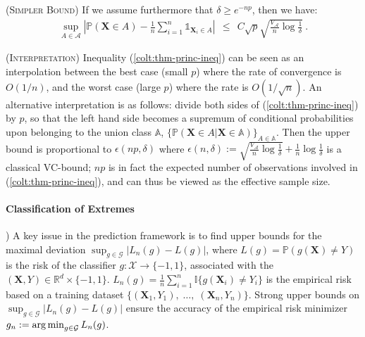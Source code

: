 \begin{remark} (\textsc{Simpler Bound})
If we assume furthermore that $\delta \ge e^{-np}$, then we have:
\begin{align*}
\sup_{A \in \mathcal{A}} \left | \mathbb{P}(\mathbf{X} \in A) - \frac{1}{n} \sum_{i=1}^n \mathds{1}_{\mathbf{X}_i \in A} \right| ~~\le~~ C \sqrt{p} \sqrt{\frac{V_{\mathcal{A}}}{n} \log{\frac{1}{\delta}}}~.
\end{align*}
\end{remark}

\begin{remark} (\textsc{Interpretation})
\label{colt:rk:interpretation}
Inequality (\ref{colt:thm-princ-ineq}) can be seen as an interpolation
between the best case (small $p$) where the rate of convergence is
$O(1/n)$,  %
and the worst case (large $p$) where the rate is $O(1/\sqrt{n})$.
An alternative interpretation is as follows: divide both sides of
(\ref{colt:thm-princ-ineq}) by $p$, so that the left hand side becomes  a
supremum of 
conditional probabilities   upon belonging to the union class
$\mathbb{A}$, $\{\mathbb{P}(\mathbf{X}\in A \big|\mathbf{X}\in \mathbb{A}) \}_{A\in\mathbb{A}}$. Then the upper bound is proportional to $\epsilon(np, \delta)$ where $\epsilon(n, \delta) :=\sqrt{\frac{V_{\mathcal{A}}}{n} \log{\frac{1}{\delta}}} + \frac{1}{n} \log{\frac{1}{\delta}}$ is a classical VC-bound; $np$ is in fact the expected number of observations involved in (\ref{colt:thm-princ-ineq}), and can thus be viewed as the effective sample size. %
\end{remark}


\paragraph{Classification of Extremes})
A key issue in the prediction framework is to find upper bounds for the maximal deviation $\sup_{g \in \mathcal{G}}|L_n(g) - L(g)|$, where $L(g) = \mathbb{P}(g(\mathbf{X}) \neq Y)$ is the risk of the classifier $g: \mathcal{X} \to \{-1, 1\}$, associated with the \rv~$(\mathbf{X},Y) \in \mathbb{R}^d \times \{-1,1\}$. $L_n(g) = \frac{1}{n} \sum_{i=1}^n \mathds{I}\{g(\mathbf{X}_i)\neq Y_i\} $ is the empirical risk based on a training dataset $\{(\mathbf{X}_1,Y_1),\; \ldots,\; (\mathbf{X}_n,Y_n)  \}$. Strong upper bounds on $\sup_{g \in \mathcal{G}}|L_n(g) - L(g)|$ ensure the accuracy of the empirical risk minimizer $g_n:= \argmin_{g \in \mathcal{G}}L_n(g)$. 

